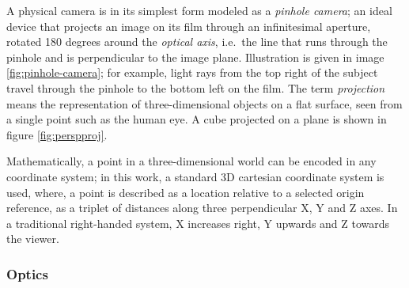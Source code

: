
A physical camera is in its simplest form modeled as a \emph{pinhole camera}; an ideal device that projects an image on its film through an infinitesimal aperture, rotated 180 degrees around the \emph{optical axis}, i.e.\ the line that runs through the pinhole and is perpendicular to the image plane.
Illustration is given in image \ref{fig:pinhole-camera}; for example, light rays from the top right of the subject travel through the pinhole to the bottom left on the film.
The term \emph{projection} means the representation of three-dimensional objects on a flat surface, seen from a single point such as the human eye.
A cube projected on a plane is shown in figure \ref{fig:perspproj}.




Mathematically, a point in a three-dimensional world can be encoded in any coordinate system;
in this work, a standard 3D cartesian coordinate system is used, where, a point is described as a location relative to a selected origin reference, as a triplet of distances along three perpendicular X, Y and Z axes. %
In a traditional right-handed system, X increases right, Y upwards and Z towards the viewer.



\subsubsection{Optics} %

